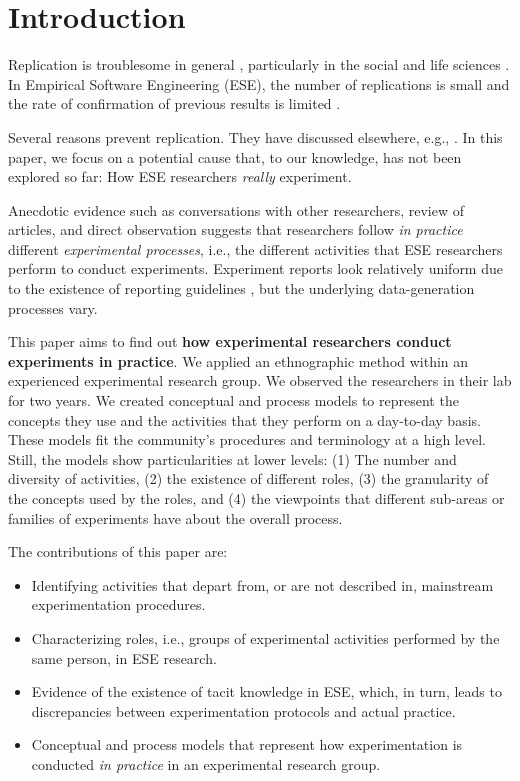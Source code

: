 \section{Introduction}\label{sec-introduction}
Replication is troublesome in general \cite{Klein-2018-many}, particularly in the social and life sciences \cite{Pashler-2012-perspectives} \cite{Baker-2016-lid-reproducibility}. In Empirical Software Engineering (ESE), the number of replications is small \cite{Bezerra-2015-Replication-SE-U-SMS} and the rate of confirmation of previous results is limited \cite{Jorgensen-2016-Incorrects-Results-SEE}.

Several reasons prevent replication. They have discussed elsewhere, e.g., \cite{Miller-2005-replicating-SE-experiments} \cite{Demagalhaes-2015-replications-SE}. In this paper, we focus on a potential cause that, to our knowledge, has not been explored so far: How ESE researchers \textit{really} experiment. 

Anecdotic evidence such as conversations with other researchers, review of articles, and direct observation suggests that researchers follow \textit{in practice} different \textit{experimental processes}, i.e., the different activities that ESE researchers perform to conduct experiments. Experiment reports look relatively uniform due to the existence of reporting guidelines \cite{Carver-2010-guidelines-replication-SE} \cite{Jedlitschka-2008-reporting-experiments-SE}, but the underlying data-generation processes vary.

This paper aims to find out \textbf{how experimental researchers conduct experiments in practice}. We applied an ethnographic method \cite{Sharp-2016-Ethnographic-Studies-ESE} within an experienced experimental research group. We observed the researchers in their lab for two years. We created conceptual and process models to represent the concepts they use and the activities that they perform on a day-to-day basis. These models fit the community's procedures and terminology at a high level. Still, the models show particularities at lower levels: (1) The number and diversity of activities, (2) the existence of different roles, (3) the granularity of the concepts used by the roles, and (4) the viewpoints that different sub-areas or families of experiments have about the overall process.

The contributions of this paper are:

\begin{itemize}
  \item Identifying activities that depart from, or are not described in, mainstream experimentation procedures. 
  \item Characterizing roles, i.e., groups of experimental activities performed by the same person, in ESE research.
  \item Evidence of the existence of tacit knowledge in ESE, which, in turn, leads to discrepancies between experimentation protocols and actual practice.
  \item Conceptual and process models that represent how experimentation is conducted \textit{in practice} in an experimental research group.
\end{itemize}

